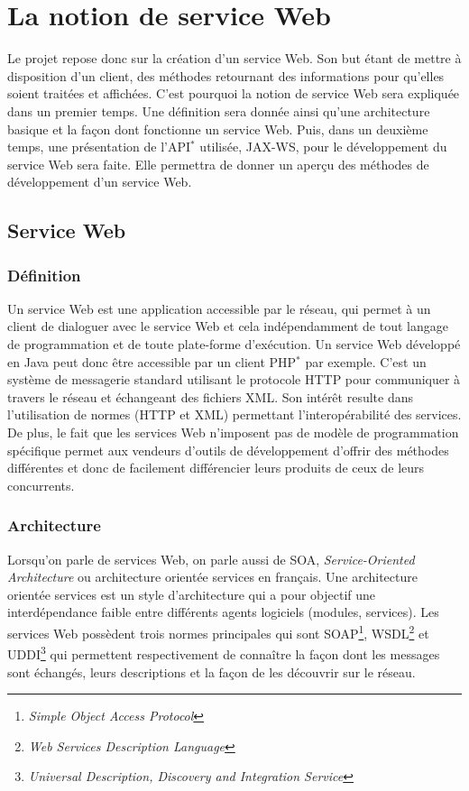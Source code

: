 \chapter{La notion de service Web}
\label{section:serviceWeb}

Le projet repose donc sur la cr\'eation d'un service Web.
Son but \'etant de mettre \`a disposition d'un client, des m\'ethodes retournant des informations pour qu'elles soient trait\'ees et affich\'ees.
C'est pourquoi la notion de service Web sera expliqu\'ee dans un premier temps.
Une d\'efinition sera donn\'ee ainsi qu'une architecture basique et la fa\c{c}on dont fonctionne un service Web.
Puis, dans un deuxi\`eme temps, une pr\'esentation de l'API$^*$ utilis\'ee, JAX-WS, pour le d\'eveloppement du service Web sera faite.
Elle permettra de donner un aper\c{c}u des m\'ethodes de d\'eveloppement d'un service Web.

\section{Service Web}

\subsection{D\'efinition}

Un service Web est une application accessible par le r\'eseau, qui permet \`a un client de dialoguer avec le service Web et cela ind\'ependamment de tout langage de programmation et de toute plate-forme d'ex\'ecution.
Un service Web d\'evelopp\'e en Java peut donc \^etre accessible par un client PHP$^*$ par exemple.
C'est un syst\`eme de messagerie standard utilisant le protocole HTTP pour communiquer \`a travers le r\'eseau et \'echangeant des fichiers XML.
Son int\'er\^et resulte dans l'utilisation de normes (HTTP et XML) permettant l'interop\'erabilit\'e des services.
De plus, le fait que les services Web n'imposent pas de mod\`ele de programmation sp\'ecifique permet aux vendeurs d'outils de d\'eveloppement d'offrir des m\'ethodes diff\'erentes et donc de facilement diff\'erencier leurs produits de ceux de leurs concurrents.

\subsection{Architecture}

Lorsqu'on parle de services Web, on parle aussi de SOA, \textit{Service-Oriented Architecture} ou architecture orient\'ee services en fran\c{c}ais.
Une architecture orient\'ee services est un style d'architecture qui a pour objectif une interd\'ependance faible entre diff\'erents agents logiciels (modules, services).
Les services Web poss\`edent trois normes principales qui sont SOAP\protect\footnote{\textit{Simple Object Access Protocol}}, WSDL\protect\footnote{\textit{Web Services Description Language}} et UDDI\protect\footnote{\textit{Universal Description, Discovery and Integration Service}} qui permettent respectivement de conna\^itre la fa\c{c}on dont les messages sont \'echang\'es, leurs descriptions et la fa\c{c}on de les d\'ecouvrir sur le r\'eseau.

